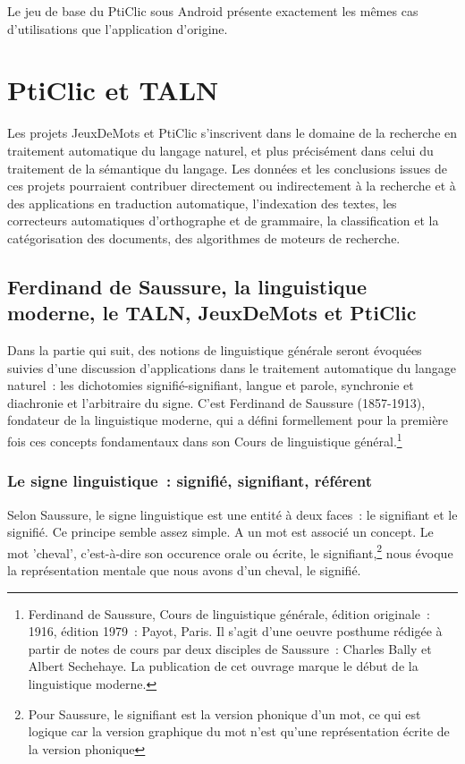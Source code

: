 \documentclass[a4paper,11pt,french]{article}
\def\android{Android\texttrademark{}}
\begin{document}
Le jeu de base du PtiClic sous \android{} présente exactement les mêmes cas d'utilisations que l'application d'origine. 


\section{PtiClic et TALN}


Les projets JeuxDeMots et PtiClic s'inscrivent dans le domaine de la recherche en traitement automatique du langage naturel, et plus précisément dans celui du traitement de la sémantique du langage. Les données et les conclusions issues de ces projets pourraient contribuer directement ou indirectement à la recherche et à des applications en traduction automatique, l'indexation des textes, les correcteurs automatiques d'orthographe et de grammaire, la classification et la catégorisation des documents, des algorithmes de moteurs de recherche.


\subsection{Ferdinand de Saussure, la linguistique moderne, le TALN, JeuxDeMots et PtiClic}

Dans la partie qui suit, des notions de linguistique générale seront évoquées suivies d'une discussion d'applications dans le traitement automatique du langage naturel~: les dichotomies signifié-signifiant, langue et parole, synchronie et diachronie et l'arbitraire du signe. C'est Ferdinand de Saussure (1857-1913), fondateur de la linguistique moderne, qui a défini formellement pour la première fois ces concepts fondamentaux dans son Cours de linguistique général.\footnote{Ferdinand de Saussure, Cours de linguistique générale, édition originale~: 1916, édition 1979~: Payot, Paris. Il s'agit d'une oeuvre posthume rédigée à partir de notes de cours par deux disciples de Saussure~: Charles Bally et Albert Sechehaye. La publication de cet ouvrage marque le début de la linguistique moderne.}

\subsubsection{Le signe linguistique~: signifié, signifiant, référent}

Selon Saussure, le signe linguistique est une entité à deux faces~: le signifiant et le signifié. Ce principe semble assez simple. A un mot est associé un concept. Le mot 'cheval', c'est-à-dire son occurence orale ou écrite, le signifiant,\footnote{Pour Saussure, le signifiant est la version phonique d'un mot, ce qui est logique car la version graphique du mot n'est qu'une représentation écrite de la version phonique} nous évoque la représentation mentale que nous avons d'un cheval, le signifié. 
\end{document}
